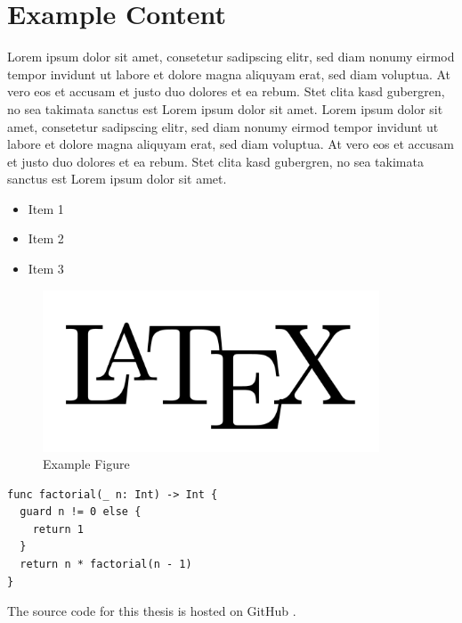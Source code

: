 \chapter{Example Content}

Lorem ipsum dolor sit amet, consetetur sadipscing elitr, sed diam nonumy eirmod tempor invidunt ut labore et dolore magna aliquyam erat, sed diam voluptua. At vero eos et accusam et justo duo dolores et ea rebum. Stet clita kasd gubergren, no sea takimata sanctus est Lorem ipsum dolor sit amet. Lorem ipsum dolor sit amet, consetetur sadipscing elitr, sed diam nonumy eirmod tempor invidunt ut labore et dolore magna aliquyam erat, sed diam voluptua. At vero eos et accusam et justo duo dolores et ea rebum. Stet clita kasd gubergren, no sea takimata sanctus est Lorem ipsum dolor sit amet.

\begin{itemize}
	\item Item 1
	\item Item 2
	\item Item 3
\end{itemize}

\begin{figure}[H]
\caption{Example Figure}
\label{FigureExample}
\centering
\includegraphics[width=100mm]{images/latex-logo.png}
\end{figure}

\begin{lstlisting}[label=LstSwiftCodeExample, style=Basic, language=CustomSwift, caption={Swift Code Listing}]
func factorial(_ n: Int) -> Int {
  guard n != 0 else {
    return 1
  }
  return n * factorial(n - 1)
}
\end{lstlisting}

The source code for this thesis is hosted on GitHub \cite{github}.